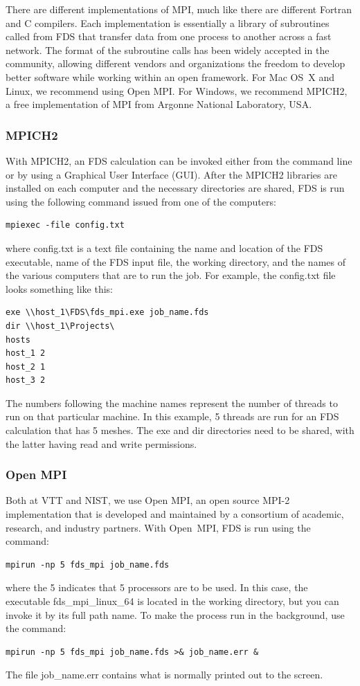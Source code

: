\documentclass[11pt]{book}
\begin{document}
There are different implementations of MPI, much like there are different Fortran and C compilers. Each implementation is essentially a library of subroutines called from FDS that transfer data from one process to another across a fast network. The format of the subroutine calls has been widely accepted in the community, allowing different vendors and organizations the freedom to develop better software while working within an open framework. For Mac OS~X and Linux, we recommend using Open MPI. For Windows, we recommend MPICH2, a free implementation of MPI from Argonne National Laboratory, USA.

\subsubsection{MPICH2}

With MPICH2, an FDS calculation can be invoked either from the command line or by using a Graphical User Interface (GUI). After the MPICH2 libraries are installed on each computer and the necessary directories are shared, FDS is run using the following command issued from one of the computers:
\begin{lstlisting}
mpiexec -file config.txt
\end{lstlisting}
where {\ct config.txt} is a text file containing the name and location of the FDS executable, name of the FDS input file, the working directory, and the names of the various computers that are to run the job. For example, the {\ct config.txt} file looks something like this:
\begin{lstlisting}
exe \\host_1\FDS\fds_mpi.exe job_name.fds
dir \\host_1\Projects\
hosts
host_1 2
host_2 1
host_3 2
\end{lstlisting}
The numbers following the machine names represent the number of threads to run on that particular machine. In this example, 5 threads are run for an FDS calculation that has 5 meshes. The {\ct exe} and {\ct dir} directories need to be shared, with the latter having read and write permissions.


\subsubsection{Open MPI}

Both at VTT and NIST, we use Open MPI, an open source MPI-2 implementation that is developed and maintained by a consortium of academic, research, and industry partners. With Open~MPI, FDS is run using the command:
\begin{lstlisting}
mpirun -np 5 fds_mpi job_name.fds
\end{lstlisting}
where the 5 indicates that 5 processors are to be used. In this case, the executable {\ct fds\_mpi\_linux\_64} is located in the working directory, but you can invoke it by its full path name. To make the process run in the background, use the command:
\begin{lstlisting}
mpirun -np 5 fds_mpi job_name.fds >& job_name.err &
\end{lstlisting}
The file {\ct job\_name.err} contains what is normally printed out to the screen.
\end{document}

